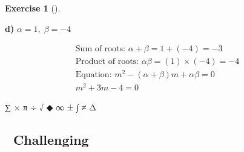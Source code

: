 \documentclass[
  letterpaper,
  DIV=11,
  numbers=noendperiod]{scrreprt}
\theoremstyle{definition}
\newtheorem{exercise}{Exercise}[chapter]
\theoremstyle{remark}
\begin{document}
\begin{exercise}[]
\begin{tcolorbox}
\textbf{d)} \(\displaystyle \alpha = 1,\; \beta = -4\)

\begin{align*}
\text{Sum of roots: } \alpha + \beta = 1 + (-4) = -3 \\ \text{Product of roots: } \alpha\beta = (1) \times (-4) = -4 \\ \text{Equation: } m^2 - (\alpha+\beta)m + \alpha\beta = 0 \\ m^2 + 3m - 4 = 0
\end{align*}

\end{tcolorbox}

\end{exercise}

∑ × π ÷ √ ◆ ∞ ± ∫ ≠ Δ

\subsection{🔴 Challenging}
\end{document}
